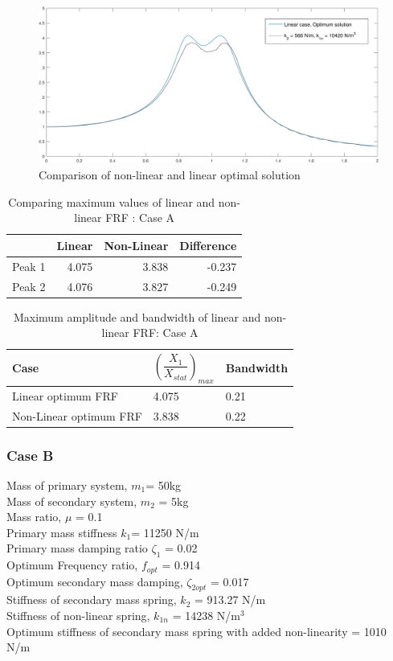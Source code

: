\begin{figure}[h!]
\includegraphics[width=\textwidth, height = 0.5\textwidth]{"figures/2comparing"}
\caption{Comparison of non-linear and linear optimal solution}
\end{figure}

\begin{table}[h!]
\centering
\caption{Comparing maximum values of linear and non-linear FRF : Case A}
\begin{tabular}{|r|r|r|r|}
\hline
 & Linear & Non-Linear & Difference \\ \hline
Peak 1& 4.075 & 3.838 & -0.237\\
Peak 2 & 4.076  & 3.827 & -0.249\\ \hline
\end{tabular}
\end{table}
\begin{table}
\centering
\caption{Maximum amplitude and bandwidth of linear and non-linear FRF: Case A}
\begin{tabular}{|m{6cm}|m{2cm}|m{2cm}|}
\hline
Case& $\left(\dfrac{X_{1}}{X_{stat}}\right)_{max}$ & Bandwidth \\
\hline
Linear optimum FRF & 4.075 & 0.21 

\\
\hline
Non-Linear optimum FRF & 3.838 & 0.22

 \\ 
\hline
\end{tabular}
\end{table}


\subsubsection{Case B}
Mass of primary system, $m_1$= 50kg\\
Mass of secondary system, $m_2$ = 5kg\\
Mass ratio, $\mu$ = 0.1\\
Primary mass stiffness $k_1$= 11250 N/m\\
Primary mass damping ratio $\zeta_1$ = 0.02\\
Optimum Frequency ratio, $f_{opt}$ = 0.914\\
Optimum secondary mass damping, $\zeta_{2opt}$ = 0.017\\
Stiffness of secondary mass spring, $k_2$ = 913.27 N/m \\
Stiffness of non-linear spring, $k_{1n}$ = 14238 N/m$^3$\\
Optimum stiffness of secondary mass spring with added non-linearity = 1010 N/m

